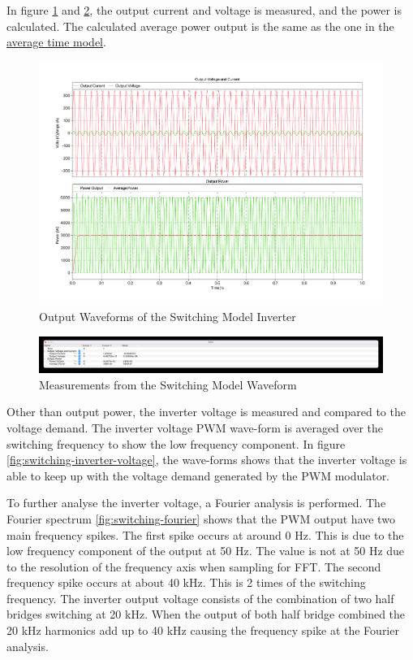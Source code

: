\documentclass[12pt]{article}
\begin{document}
In figure \ref{fig:switching-waveform} and \ref{fig:switching-cursor}, the output current and voltage is measured, and the power is calculated.
The calculated average power output is the same as the one in the \hyperref[sec:avg-time-model]{average time model}.

\begin{figure}[ht]
    \centering{}
    \includegraphics[width=\textwidth, height=0.4\textheight, keepaspectratio]{img/Switching Power.pdf}
    \caption{Output Waveforms of the Switching Model Inverter}
    \label{fig:switching-waveform}
\end{figure}

\begin{figure}[ht]
    \centering{}
    \includegraphics[width=\textwidth, height=0.4\textheight, keepaspectratio]{img/Switching Power Cursor.jpg}
    \caption{Measurements from the Switching Model Waveform}
    \label{fig:switching-cursor}
\end{figure}

Other than output power, the inverter voltage is measured and compared to the voltage demand.
The inverter voltage PWM wave-form is averaged over the switching frequency to show the low frequency component.
In figure \ref{fig:switching-inverter-voltage}, the wave-forms shows that the inverter voltage is able to keep up with the voltage demand generated by the PWM modulator.

To further analyse the inverter voltage, a Fourier analysis is performed.
The Fourier spectrum \ref{fig:switching-fourier} shows that the PWM output have two main frequency spikes.
The first spike occurs at around 0 Hz.
This is due to the low frequency component of the output at 50 Hz.
The value is not at 50 Hz due to the resolution of the frequency axis when sampling for FFT.
The second frequency spike occurs at about 40 kHz.
This is 2 times of the switching frequency.
The inverter output voltage consists of the combination of two half bridges switching at 20 kHz.
When the output of both half bridge combined the 20 kHz harmonics add up to 40 kHz causing the frequency spike at the Fourier analysis.
\end{document}
